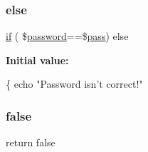 \mbox{\label{import_8php_aaa4356675ab2316ef55b1dffd0ff7b3f}} 
\subsubsection{\texorpdfstring{else}{else}}
{\footnotesize\ttfamily \hyperlink{index_8php_a5bd83a7a52ff3be468b16a8c82e43673}{if} ( \$\hyperlink{_w_s_8ino_ae59dfb8ffddb9128834034516c45e7ce}{password}==\$\hyperlink{_time_n_t_p___e_s_p8266_wi_fi_8ino_a5a1325b7c2160dc5aebb1259a2fd1094}{pass}) else}

{\bfseries Initial value\+:}
\begin{DoxyCode}
\{
    echo \textcolor{stringliteral}{"Password isn't correct!"}
\end{DoxyCode}
\mbox{\label{import_8php_a5df37b7f02e5cdc7d9412b7f872b8e01}} 
\subsubsection{\texorpdfstring{false}{false}}
{\footnotesize\ttfamily return false}

